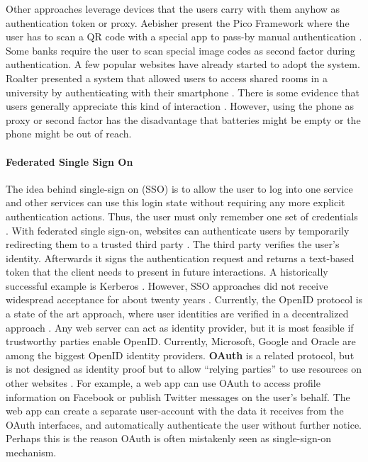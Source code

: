 	Other approaches leverage devices that the users carry with them anyhow as authentication token or proxy. Aebisher \etal present the Pico Framework where the user has to scan a QR code with a special app to pass-by manual authentication \cite{Aebischer2017PicoInTheWild}. Some banks require the user to scan special image codes as second factor during authentication. A few popular websites have already started to adopt the system. Roalter \etal presented a system that allowed users to access shared rooms in a university by authenticating with their smartphone \cite{Roalter2013SmartphoneProxy}. There is some evidence that users generally appreciate this kind of interaction \cite{Ruoti2015AuthenticationMelee}. However, using the phone as proxy or second factor has the disadvantage that batteries might be empty or the phone might be out of reach.
	
	\paragraph{Federated Single Sign On}
	The idea behind single-sign on (SSO) is to allow the user to log into one service and other services can use this login state without requiring any more explicit authentication actions. Thus, the user must only remember one set of credentials \cite{Egelman2013ProfilePassword}. With federated single sign-on, websites can authenticate users by temporarily redirecting them to a trusted third party \cite{Bonneau2012ReplacePasswords}. The third party verifies the user's identity. Afterwards it signs the authentication request and returns a text-based token that the client needs to present in future interactions. A historically successful example is Kerberos \cite{Kohl1993Kerberos}. However, SSO approaches did not receive widespread acceptance for about twenty years \cite{Sun2010BillionKeys}. Currently, the OpenID protocol is a state of the art approach, where user identities are verified in a decentralized approach \cite{Recordon2006OpenID}. Any web server can act as identity provider, but it is most feasible if trustworthy parties enable OpenID. Currently, Microsoft, Google and Oracle are among the biggest OpenID identity providers. \textbf{OAuth} is a related protocol, but is not designed as identity proof but to allow ``relying parties'' to use resources on other websites \cite{Bonneau2012ReplacePasswords}. For example, a web app can use OAuth to access profile information on Facebook or publish Twitter messages on the user's behalf. The web app can create a separate user-account with the data it receives from the OAuth interfaces, and automatically authenticate the user without further notice. Perhaps this is the reason OAuth is often mistakenly seen as single-sign-on mechanism. 
	
